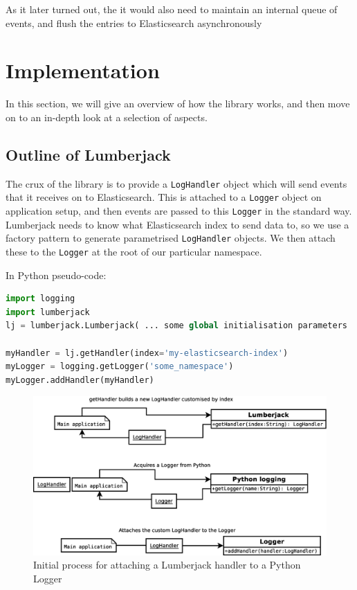 \documentclass[a4paper,11pt]{article} %
\begin{document}
As it later turned out, the  it would also need to maintain an internal queue of
events, and flush the entries to Elasticsearch asynchronously

\section{Implementation}
\label{sec:implementation}
In this section, we will give an overview of how the library works, and then
move on to an in-depth look at a selection of aspects.

\subsection{Outline of Lumberjack}
\label{sec:implementation.lumberjack}
The crux of the library is to provide a \texttt{LogHandler} object which will
send events that it receives on to Elasticsearch.  This is attached to a
\texttt{Logger} object on application setup, and then events are passed to this
\texttt{Logger} in the standard way.  Lumberjack needs to know what
Elasticsearch index to send data to, so we use a factory pattern to generate
parametrised \texttt{LogHandler} objects.  We then attach these to the
\texttt{Logger} at the root of our particular namespace.

In Python pseudo-code:
\begin{lstlisting}[language=Python,basicstyle=\ttfamily]
import logging
import lumberjack
lj = lumberjack.Lumberjack( ... some global initialisation parameters ... )

myHandler = lj.getHandler(index='my-elasticsearch-index')
myLogger = logging.getLogger('some_namespace')
myLogger.addHandler(myHandler)
\end{lstlisting}

\begin{figure}[H]
  \centering
  \includegraphics[width=\textwidth]{initialisation_step}
  \caption{Initial process for attaching a Lumberjack handler to a Python Logger}
  \label{fig:implementation.initialisation_step}
\end{figure}
\end{document}

